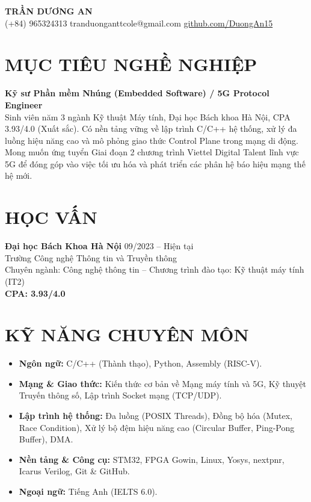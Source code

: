 \documentclass[a4paper,11pt]{article}
\begin{document}
\begin{center}
    {\Huge \bfseries \color{myblue} TRẦN DƯƠNG AN} \\[5pt]
    (+84) 965324313 \textbar{} tranduonganttcole@gmail.com \textbar{} \href{https://github.com/DuongAn15}{github.com/DuongAn15}
\end{center}

\section{MỤC TIÊU NGHỀ NGHIỆP}
\textbf{Kỹ sư Phần mềm Nhúng (Embedded Software) / 5G Protocol Engineer} \\
Sinh viên năm 3 ngành Kỹ thuật Máy tính, Đại học Bách khoa Hà Nội, CPA 3.93/4.0 (Xuất sắc). Có nền tảng vững về lập trình C/C++ hệ thống, xử lý đa luồng hiệu năng cao và mô phỏng giao thức Control Plane trong mạng di động. Mong muốn ứng tuyển Giai đoạn 2 chương trình Viettel Digital Talent lĩnh vực 5G để đóng góp vào việc tối ưu hóa và phát triển các phân hệ báo hiệu mạng thế hệ mới.

\section{HỌC VẤN}
\textbf{Đại học Bách Khoa Hà Nội} \hfill 09/2023 -- Hiện tại \\
Trường Công nghệ Thông tin và Truyền thông \\
Chuyên ngành: Công nghệ thông tin -- Chương trình đào tạo: Kỹ thuật máy tính (IT2) \\
\textbf{CPA: 3.93/4.0}

\section{KỸ NĂNG CHUYÊN MÔN}
\begin{itemize}[leftmargin=*]
    \item \textbf{Ngôn ngữ:} C/C++ (Thành thạo), Python, Assembly (RISC-V). 
    \item \textbf{Mạng \& Giao thức:} Kiến thức cơ bản về Mạng máy tính và 5G, Kỹ thuyệt Truyến thông số, Lập trình Socket mạng (TCP/UDP).
    \item \textbf{Lập trình hệ thống:} Đa luồng (POSIX Threads), Đồng bộ hóa (Mutex, Race Condition), Xử lý bộ đệm hiệu năng cao (Circular Buffer, Ping-Pong Buffer), DMA.
    \item \textbf{Nền tảng \& Công cụ:} STM32, FPGA Gowin, Linux, Yosys, nextpnr, Icarus Verilog, Git \& GitHub.
        \item \textbf{Ngoại ngữ:} Tiếng Anh (IELTS 6.0).
\end{itemize}
\end{document}
